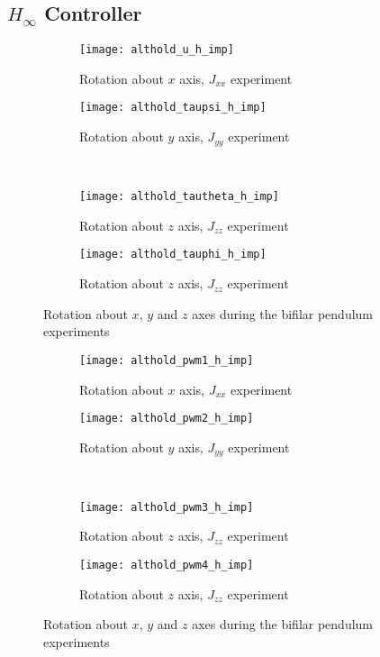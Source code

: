 \begin{appendices}
\subsection*{$H_\infty$ Controller}

\begin{figure}[H]
\begin{subfigure}{.5\linewidth}
\centering
\texttt{[image: althold\_u\_h\_imp]}
\caption{Rotation about $x$ axis, $J_{xx}$ experiment}
\label{fig:althold_u_h_imp}
\end{subfigure}%
\begin{subfigure}{.5\linewidth}
\centering
\texttt{[image: althold\_taupsi\_h\_imp]}
\caption{Rotation about $y$ axis, $J_{yy}$ experiment}
\label{fig:althold_taupsi_h_imp}
\end{subfigure}\\[1ex]
\begin{subfigure}{0.5\linewidth}
\centering
\texttt{[image: althold\_tautheta\_h\_imp]}
\caption{Rotation about $z$ axis, $J_{zz}$ experiment}
\label{fig:althold_tautheta_h_imp}
\end{subfigure}
\begin{subfigure}{0.5\linewidth}
\centering
\texttt{[image: althold\_tauphi\_h\_imp]}
\caption{Rotation about $z$ axis, $J_{zz}$ experiment}
\label{fig:althold_tauphi_h_imp}
\end{subfigure}
\caption{Rotation about $x$, $y$ and $z$ axes during the bifilar pendulum experiments}
\label{fig:althold_control_h}
\end{figure}

\begin{figure}[H]
\begin{subfigure}{.5\linewidth}
\centering
\texttt{[image: althold\_pwm1\_h\_imp]}
\caption{Rotation about $x$ axis, $J_{xx}$ experiment}
\label{fig:althold_pwm_h_imp}
\end{subfigure}%
\begin{subfigure}{.5\linewidth}
\centering
\texttt{[image: althold\_pwm2\_h\_imp]}
\caption{Rotation about $y$ axis, $J_{yy}$ experiment}
\label{fig:althold_pwm2_h_imp}
\end{subfigure}\\[1ex]
\begin{subfigure}{0.5\linewidth}
\centering
\texttt{[image: althold\_pwm3\_h\_imp]}
\caption{Rotation about $z$ axis, $J_{zz}$ experiment}
\label{fig:althold_pwm3_h_imp}
\end{subfigure}
\begin{subfigure}{0.5\linewidth}
\centering
\texttt{[image: althold\_pwm4\_h\_imp]}
\caption{Rotation about $z$ axis, $J_{zz}$ experiment}
\label{fig:althold_pwm4_h_imp}
\end{subfigure}
\caption{Rotation about $x$, $y$ and $z$ axes during the bifilar pendulum experiments}
\label{fig:althold_pwm_h}
\end{figure}


\end{appendices}
